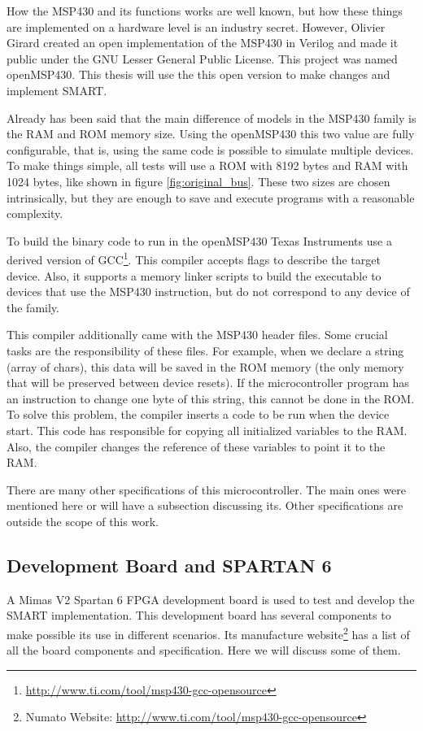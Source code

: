 How the MSP430 and its functions works are well known, but how these things are implemented on a hardware level is an industry secret. However, Olivier Girard created an open implementation of the MSP430 in Verilog and made it public under the GNU Lesser General Public License. This project was named openMSP430. This thesis will use the this open version to make changes and implement SMART.

Already has been said that the main difference of models in the MSP430 family is the RAM and ROM memory size. Using the openMSP430 this two value are fully configurable, that is, using the same code is possible to simulate multiple devices. To make things simple, all tests will use a ROM with 8192 bytes and RAM with 1024 bytes, like shown in figure \ref{fig:original_bus}. These two sizes are chosen intrinsically, but they are enough to save and execute programs with a reasonable complexity.

To build the binary code to run in the openMSP430 Texas Instruments use a derived version of GCC\footnote{\url{http://www.ti.com/tool/msp430-gcc-opensource}}. This compiler accepts flags to describe the target device. Also, it supports a memory linker scripts to build the executable to devices that use the MSP430 instruction, but do not correspond to any device of the family. 

This compiler additionally came with the MSP430 header files. Some crucial tasks are the responsibility of these files.  For example, when we declare a string (array of chars), this data will be saved in the ROM memory (the only memory that will be preserved between device resets). If the microcontroller program has an instruction to change one byte of this string, this cannot be done in the ROM. To solve this problem, the compiler inserts a code to be run when the device start. This code has responsible for copying all initialized variables to the RAM. Also, the compiler changes the reference of these variables to point it to the RAM.

There are many other specifications of this microcontroller. The main ones were mentioned here or will have a subsection discussing its.  Other specifications are outside the scope of this work. 

\subsection{Development Board and SPARTAN 6}

A Mimas V2 Spartan 6 FPGA development board is used to test and develop the SMART implementation. This development board has several components to make possible its use in different scenarios. Its manufacture website\footnote{Numato Website: \url{http://www.ti.com/tool/msp430-gcc-opensource}} has a list of all the board components and specification. Here we will discuss some of them.

